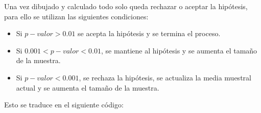 Una vez dibujado y calculado todo solo queda rechazar o aceptar la hipótesis, para ello se utilizan las siguientes condiciones:

\begin{itemize}
	\item Si $p-valor > 0.01$ se acepta la hipótesis y se termina el proceso.
	\item Si $0.001 < p-valor < 0.01$, se mantiene al hipótesis y se aumenta el tamaño de la muestra.
	\item Si $p-valor < 0.001$, se rechaza la hipótesis, se actualiza la media muestral actual y se aumenta el tamaño de la muestra.
\end{itemize}

Esto se traduce en el siguiente código:

\inputminted[firstline=101]{R}{../R/dependencias.R}
